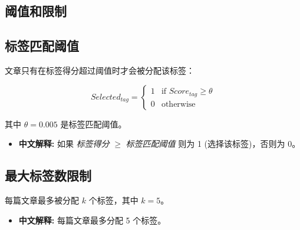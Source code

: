 \documentclass{article}
\begin{document}
\begin{CJK}{UTF8}{gbsn}
\section{阈值和限制}

\subsection{标签匹配阈值}
文章只有在标签得分超过阈值时才会被分配该标签：

\[
Selected_{tag} = \begin{cases} 
1 & \text{if } Score_{tag} \geq \theta \\
0 & \text{otherwise}
\end{cases}
\]

其中 $\theta = 0.005$ 是标签匹配阈值。
\begin{itemize}
\item \textbf{中文解释:} 如果 \emph{标签得分} $\geq$ \emph{标签匹配阈值} 则为 1 (选择该标签)，否则为 0。
\end{itemize}

\subsection{最大标签数限制}
每篇文章最多被分配 $k$ 个标签，其中 $k = 5$。
\begin{itemize}
\item \textbf{中文解释:} 每篇文章最多分配 5 个标签。
\end{itemize}

\end{CJK}
\end{document}
